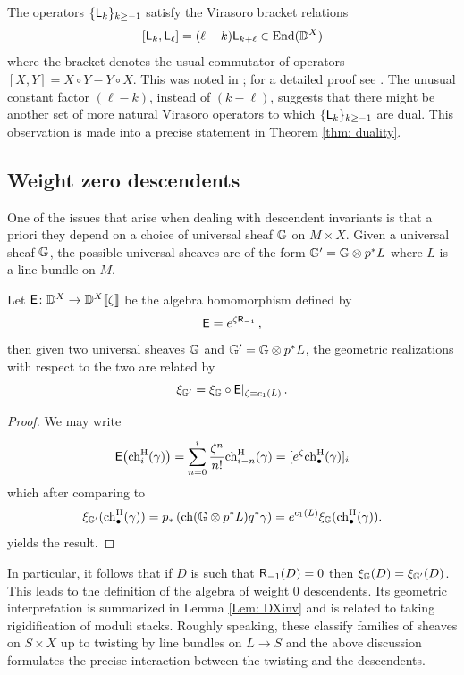 \documentclass[a4paper, 12pt]{amsart}
\begin{document}
The operators $\{{\mathsf{L}}_k\}_{k\geq -1}$ satisfy the Virasoro bracket relations
\[[{\mathsf{L}}_k, {\mathsf{L}}_\ell]=(\ell-k){\mathsf{L}}_{k+\ell}\in \textup{End}({\mathbb{D}}^X)\]
where the bracket denotes the usual commutator of operators $[X,Y]=X\circ Y-Y\circ X$.
This was noted in \cite{moop}; for a detailed proof see \cite[Proposition 2.10]{bree}. The unusual constant factor $(\ell-k)$, instead of $(k-\ell)$, suggests that there might be another set of more natural Virasoro operators to which $\{{\mathsf{L}}_k\}_{k\geq -1}$ are dual. This observation is made into a precise statement in Theorem \ref{thm: duality}. 

\subsection{Weight zero descendents}
\label{sec: invariantdescendents}



One of the issues that arise when dealing with descendent invariants is that a priori they depend on a choice of universal sheaf ${\mathbb{G}}$ on $M\times X$. Given a universal sheaf ${\mathbb{G}}$, the possible universal sheaves are of the form
${\mathbb{G}}'={\mathbb{G}}\otimes p^\ast L$ where $L$ is a line bundle on $M$.
\begin{lemma}
\label{lem: changeuniversalsheaf}
Let ${\mathsf{E}}\colon {\mathbb{D}}^X\to {\mathbb{D}}^X\llbracket\zeta\rrbracket$ be the algebra homomorphism defined by
$$
{\mathsf{E}} = e^{\zeta \mathsf{R}_{-1}}\,,
$$
then given two universal sheaves ${\mathbb{G}}$ and ${\mathbb{G}}'={\mathbb{G}}\otimes p^\ast L$, the geometric realizations with respect to the two are related by
\[\xi_{{\mathbb{G}}'}=\xi_{{\mathbb{G}}}\circ {\mathsf{E}}|_{\zeta = c_1(L)} \,.\]
\end{lemma}
\begin{proof}
We may write 
\[{\mathsf{E}}\big(\mathrm{ch}^{\mathrm{H}}_i(\gamma)\big) =\sum_{n=0}^i \frac{\zeta^n}{n!}\mathrm{ch}^{\mathrm{H}}_{i-n}(\gamma)= [e^\zeta \mathrm{ch}^{\mathrm{H}}_\bullet(\gamma)]_i\] 
which after comparing to
\[\xi_{{\mathbb{G}}'}(\mathrm{ch}^{\mathrm{H}}_\bullet(\gamma))=p_\ast\left(\mathrm{ch}({\mathbb{G}} \otimes p^\ast L)q^\ast \gamma\right)=e^{c_1(L)}\xi_{{\mathbb{G}}}(\mathrm{ch}^{\mathrm{H}}_\bullet(\gamma)).\qedhere\]
yields the result.
\end{proof}
In particular, it follows that if $D$ is such that $\mathsf{R}_{-1}(D)=0$ then $\xi_{\mathbb{G}}(D)=\xi_{{\mathbb{G}}'}(D)$. This leads to the definition of the algebra of weight 0 descendents. Its geometric interpretation is summarized in Lemma \ref{Lem: DXinv} and is related to taking rigidification of moduli stacks. Roughly speaking, these classify families of sheaves on $S\times X$ 
up to twisting by line bundles on $L\to S$ and the above discussion formulates the precise interaction between the twisting and the descendents. 
\end{document}
